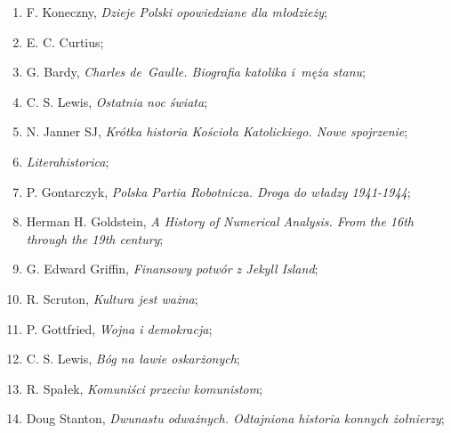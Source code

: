 \documentclass[a4paper,11pt]{article}
\begin{document}
\begin{enumerate}

\item F. Koneczny, \textit{Dzieje Polski opowiedziane dla młodzieży};



\item E. C. Curtius;



\item G. Bardy, \textit{Charles de~Gaulle. Biografia katolika i~męża
    stanu};



\item C. S. Lewis, \textit{Ostatnia noc świata};



\item N. Janner SJ, \textit{Krótka historia Kościoła Katolickiego. Nowe
    spojrzenie};



\item \textit{Literahistorica};



\item P. Gontarczyk, \textit{Polska Partia Robotnicza. Droga do władzy
    1941-1944};



\item Herman H. Goldstein, \textit{A History of Numerical Analysis. From
    the 16th through the 19th century};



\item G. Edward Griffin, \textit{Finansowy potwór z Jekyll Island};



\item R. Scruton, \textit{Kultura jest ważna};



\item P. Gottfried, \textit{Wojna i demokracja};



\item C. S. Lewis, \textit{Bóg na ławie oskarżonych};



\item R. Spałek, \textit{Komuniści przeciw komunistom};



\item Doug Stanton, \textit{Dwunastu odważnych. Odtajniona historia
    konnych żołnierzy};




\end{enumerate}
\end{document}
